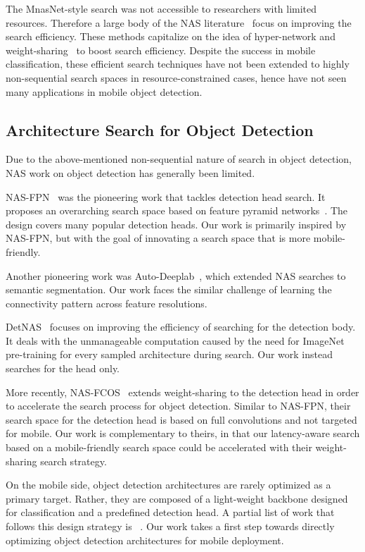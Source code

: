\documentclass[10pt,twocolumn,letterpaper]{article}
\begin{document}
The MnasNet-style search was not accessible to researchers with limited resources. Therefore a large body of the NAS literature~\cite{cai2018proxylessnas, wu2019fbnet,cai2019once} focus on improving the search efficiency. These methods capitalize on the idea of hyper-network and weight-sharing~\cite{cai2018proxylessnas, bender2018understanding,pham2018efficient} to boost search efficiency. Despite the success in mobile classification, these efficient search techniques have not been extended to highly non-sequential search spaces in resource-constrained cases, hence have not seen many applications in mobile object detection.

\subsection{Architecture Search for Object Detection}

Due to the above-mentioned non-sequential nature of search in object detection, NAS work on object detection has generally been limited.

NAS-FPN~\cite{ghiasi2019fpn} was the pioneering work that tackles detection head search. It proposes an overarching search space based on feature pyramid networks~\cite{lin2017feature}. The design covers many popular detection heads. Our work is primarily inspired by NAS-FPN, but with the goal of innovating a search space that is more mobile-friendly. 

Another pioneering work was Auto-Deeplab~\cite{liu2019auto}, which extended NAS searches to semantic segmentation. Our work faces the similar challenge of learning the connectivity pattern across feature resolutions.

DetNAS~\cite{chen2019detnas} focuses on improving the efficiency of searching for the detection body. It deals with the unmanageable computation caused by the need for ImageNet pre-training for every sampled architecture during search. Our work instead searches for the head only.

More recently, NAS-FCOS~\cite{wang2019nasfcos} extends  weight-sharing to the detection head in order to accelerate the search process for object detection. Similar to NAS-FPN, their search space for the detection head is based on full convolutions and not targeted for mobile. Our work is complementary to theirs, in that our latency-aware search based on a mobile-friendly search space could be accelerated with their weight-sharing search strategy.

On the mobile side, object detection architectures are rarely optimized as a primary target. Rather, they are composed of a light-weight backbone designed for classification and a predefined detection head. A partial list of work that follows this design strategy is ~\cite{howard2019searching, tan2019mnasnet, sandler2018mobilenetv2, zhang2018shufflenet}. 
Our work takes a first step towards directly optimizing object detection architectures for mobile deployment. 
\end{document}

